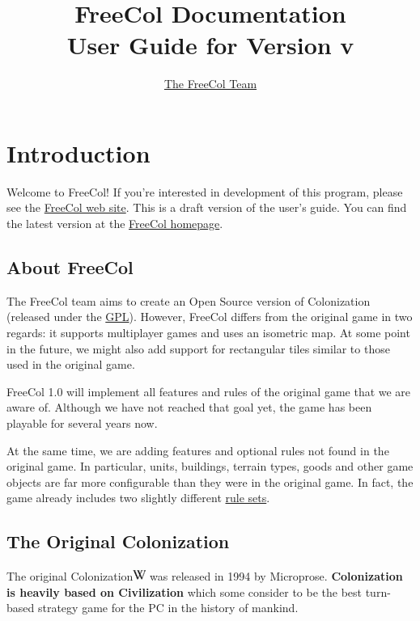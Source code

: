 \documentclass[12pt]{book}
\newcommand{\Wikipedia}[1]{\href{http://en.wikipedia.org/wiki/#1}%
{\includegraphics[scale=0.6]{images/wikipedia.png}}}
\begin{document}
\author{\href{http://www.freecol.org/team-and-credits.html}{The FreeCol Team}}
\title{FreeCol Documentation\\User Guide for Version v\fcversion}
\maketitle{}

\tableofcontents
\newpage


\hypertarget{Introduction}{\chapter{Introduction}}

Welcome to FreeCol! If you're interested in development of this
program, please see the \href{http://www.freecol.org/}{FreeCol
web site}. This is a draft version of the user's guide. You can find
the latest version at the
\href{http://www.freecol.org/}{FreeCol homepage}.

\hypertarget{About FreeCol}{\section{About FreeCol}}

The FreeCol team aims to create an Open Source version of Colonization
(released under the \href{http://www.gnu.org/licenses/gpl.html}{GPL}).
However, FreeCol differs from the original game in two regards: it
supports multiplayer games and uses an isometric map. At some point in
the future, we might also add support for rectangular tiles similar to
those used in the original game.

FreeCol 1.0 will implement all features and rules of the original game
that we are aware of. Although we have not reached that goal yet, the
game has been playable for several years now.

At the same time, we are adding features and optional rules not found
in the original game. In particular, units, buildings, terrain types,
goods and other game objects are far more configurable than they were
in the original game. In fact, the game already includes two slightly
different \hyperlink{About this manual}{rule sets}.


\hypertarget{The Original Colonization}{\section{The Original Colonization}}

The original Colonization\Wikipedia{Colonization (computer game)} was
released in 1994 by Microprose. \textbf{Colonization is heavily based
on Civilization} which some consider to be the best turn-based
strategy game for the PC in the history of mankind.
\end{document}

